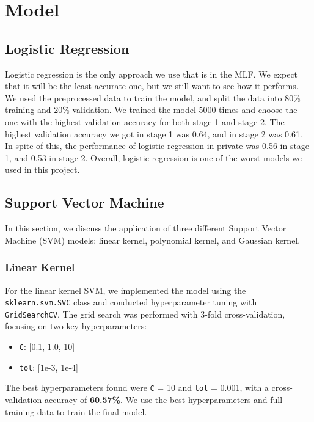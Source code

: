 \documentclass[12pt,a4paper]{article}
\begin{document}
\section{Model}

\subsection{Logistic Regression}

Logistic regression is the only approach we use that is in the MLF. We expect that it will be the least accurate one, but we still want to see how it performs. We used the preprocessed data to train the model, and split the data into 80\% training and 20\% validation. We trained the model 5000 times and choose the one with the highest validation accuracy for both stage 1 and stage 2. The highest validation accuracy we got in stage 1 was 0.64, and in stage 2 was 0.61. In spite of this, the performance of logistic regression in private was 0.56 in stage 1, and 0.53 in stage 2. Overall, logistic regression is one of the worst models we used in this project.



\subsection{Support Vector Machine}

In this section, we discuss the application of three different Support Vector Machine (SVM) models: linear kernel, polynomial kernel, and Gaussian kernel.


\subsubsection{Linear Kernel}

For the linear kernel SVM, we implemented the model using the \texttt{sklearn.svm.SVC} class and conducted hyperparameter tuning with \texttt{GridSearchCV}. The grid search was performed with 3-fold cross-validation, focusing on two key hyperparameters:
\begin{itemize}
    \item \texttt{C}: [0.1, 1.0, 10]
    \item \texttt{tol}: [1e-3, 1e-4]
\end{itemize}

The best hyperparameters found were \texttt{C} = 10 and \texttt{tol} = 0.001, with a cross-validation accuracy of \textbf{60.57\%}. We use the best hyperparameters and full training data to train the final model.
\end{document}
